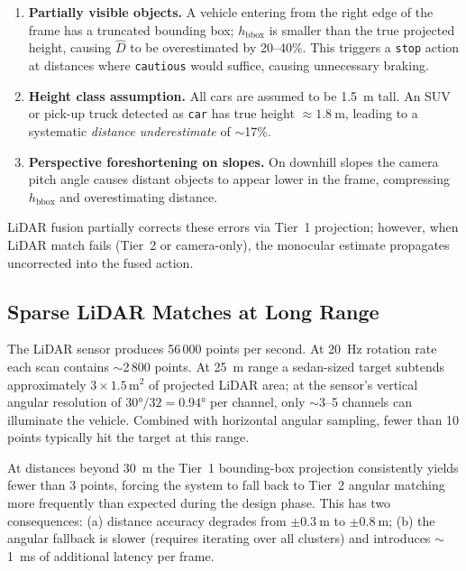 \documentclass[12pt,a4paper]{article}
\begin{document}
\begin{enumerate}[nosep,label=\textbf{\arabic*.}]
  \item \textbf{Partially visible objects.}  A vehicle entering from the right
        edge of the frame has a truncated bounding box; $h_\text{bbox}$ is
        smaller than the true projected height, causing $\hat{D}$ to be
        overestimated by 20--40\%.  This triggers a \texttt{stop} action at
        distances where \texttt{cautious} would suffice, causing unnecessary
        braking.
  \item \textbf{Height class assumption.}  All cars are assumed to be
        \SI{1.5}{\metre} tall.  An SUV or pick-up truck detected as
        \texttt{car} has true height $\approx\SI{1.8}{\metre}$, leading to a
        systematic \textit{distance underestimate} of $\sim$17\%.
  \item \textbf{Perspective foreshortening on slopes.}  On downhill slopes the
        camera pitch angle causes distant objects to appear lower in the
        frame, compressing $h_\text{bbox}$ and overestimating distance.
\end{enumerate}

LiDAR fusion partially corrects these errors via Tier~1 projection; however,
when LiDAR match fails (Tier~2 or camera-only), the monocular estimate
propagates uncorrected into the fused action.

\subsection{Sparse LiDAR Matches at Long Range}

The LiDAR sensor produces 56\,000 points per second.  At \SI{20}{\hertz}
rotation rate each scan contains $\sim$2\,800 points.  At
\SI{25}{\metre} range a sedan-sized target subtends approximately
$3 \times 1.5$\,m$^2$ of projected LiDAR area; at the sensor's vertical
angular resolution of $30°/32 = 0.94°$ per channel, only
$\sim$3--5 channels can illuminate the vehicle.  Combined with horizontal
angular sampling, fewer than 10 points typically hit the target at this range.

At distances beyond \SI{30}{\metre} the Tier~1 bounding-box projection
consistently yields fewer than 3 points, forcing the system to fall back to
Tier~2 angular matching more frequently than expected during the design phase.
This has two consequences: (a) distance accuracy degrades from
$\pm\SI{0.3}{\metre}$ to $\pm\SI{0.8}{\metre}$; (b) the angular fallback is
slower (requires iterating over all clusters) and introduces
$\sim$\SI{1}{\milli\second} of additional latency per frame.
\end{document}
